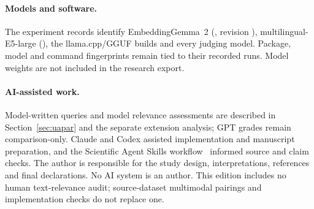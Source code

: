 \paragraph{Models and software.}
The experiment records identify EmbeddingGemma~2 (, revision ), multilingual-E5-large (), the llama.cpp/GGUF builds and every judging model. Package, model and command fingerprints remain tied to their recorded runs. Model weights are not included in the research export.

\paragraph{AI-assisted work.}
Model-written queries and model relevance assessments are described in Section~\ref{sec:uapar} and the separate extension analysis; GPT grades remain comparison-only. Claude and Codex assisted implementation and manuscript preparation, and the Scientific Agent Skills workflow~\citep{kassis2026skills} informed source and claim checks. The author is responsible for the study design, interpretations, references and final declarations. No AI system is an author. This edition includes no human text-relevance audit; source-dataset multimodal pairings and implementation checks do not replace one.
